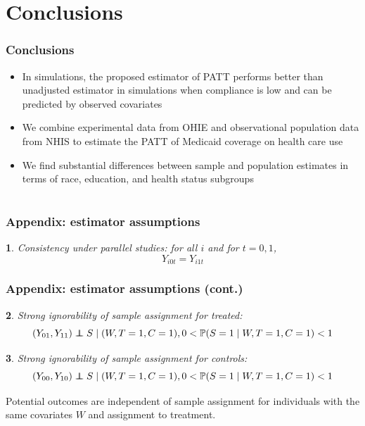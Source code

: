 \documentclass{beamer}
\makeatletter
\newtheorem*{assumption*}{\assumptionnumber}
\providecommand{\assumptionnumber}{}
\newenvironment{assumption}[2]
 {%
  \renewcommand{\assumptionnumber}{Assumption #1}%
  \begin{assumption*}%
  \protected@edef\@currentlabel{#1}%
 }
 {%
  \end{assumption*}
 }
\newcommand{\pr}{\mathbb{P}} %
\newcommand\independent{\protect\mathpalette{\protect\independenT}{\perp}}
\def\independenT#1#2{\mathrel{\rlap{$#1#2$}\mkern2mu{#1#2}}}
\makeatother
\begin{document}
\section[Conclusions]{Conclusions}

\begin{frame}
\frametitle{Conclusions}
\begin{itemize}
\item In simulations, the proposed estimator of PATT performs better than unadjusted estimator in simulations when compliance is low and can be predicted by observed covariates
\item We combine experimental data from OHIE and observational population data from NHIS to estimate the PATT of Medicaid coverage on health care use
\item We find substantial differences between sample and population estimates in terms of race, education, and health status subgroups
\end{itemize}
\end{frame}

\section[References]{}

\begin{frame}
\begin{singlespace}
\begin{tiny}


\end{tiny}
\end{singlespace}
\itemize
\end{frame}

\begin{frame}
\frametitle{Appendix: estimator assumptions}
\begin{assumption}{1}{}\label{consistency}
Consistency under parallel studies: for all $i$ and for $t=0, 1$,
$$Y_{i0t} = Y_{i1t}$$
\end{assumption}
\end{frame}

\begin{frame}
\frametitle{Appendix: estimator assumptions (cont.)}
\begin{assumption}{2}{}\label{si_treat}
Strong ignorability of sample assignment for treated:
\begin{equation*}
(Y_{01}, Y_{11}) \independent S \mid (W, T=1,C = 1), 0 < \pr(S=1 \mid W, T=1,C = 1) <1 
\end{equation*}
\end{assumption}

\begin{assumption}{3}{}\label{si_ctrl}
Strong ignorability of sample assignment for controls:
\begin{equation*}
(Y_{00}, Y_{10}) \independent S \mid (W, T=1,C = 1), 0 < \pr(S=1 \mid W, T=1,C = 1) <1 
\end{equation*}\end{assumption}

\noindent Potential outcomes are independent of sample assignment for individuals with the same covariates $W$ and assignment to treatment.
\end{frame}
\end{document}
